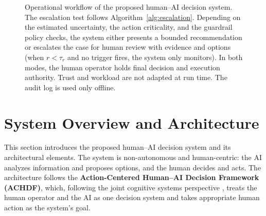 \documentclass[journal]{IEEEtran}
\theoremstyle{plain}
\theoremstyle{definition}
\begin{document}
\begin{figure}[t]
        \caption{Operational workflow of the proposed human--AI decision system.
The escalation test follows Algorithm~\ref{alg:escalation}. Depending on the estimated uncertainty, the action criticality, and the guardrail policy checks, the system either presents a bounded recommendation or escalates the case for human review with evidence and options (when $r < \tau_r$ and no trigger fires, the system only monitors). In both modes, the human operator holds final decision and execution authority. Trust and workload are not adapted at run time. The audit log is used only offline.}
        \label{fig:system_overview}
    \end{figure}

    \section{System Overview and Architecture}
    \label{sec:system}
    This section introduces the proposed human--AI decision system and its architectural elements. The system is non-autonomous and human-centric: the AI analyzes information and proposes options, and the human decides and acts. The architecture follows the \textbf{Action-Centered Human--AI Decision Framework (ACHDF)}, which, following the joint cognitive systems perspective \cite{Hollnagel2005JCS,Woods2006JCS}, treats the human operator and the AI as one decision system and takes appropriate human action as the system's goal.
\end{document}
